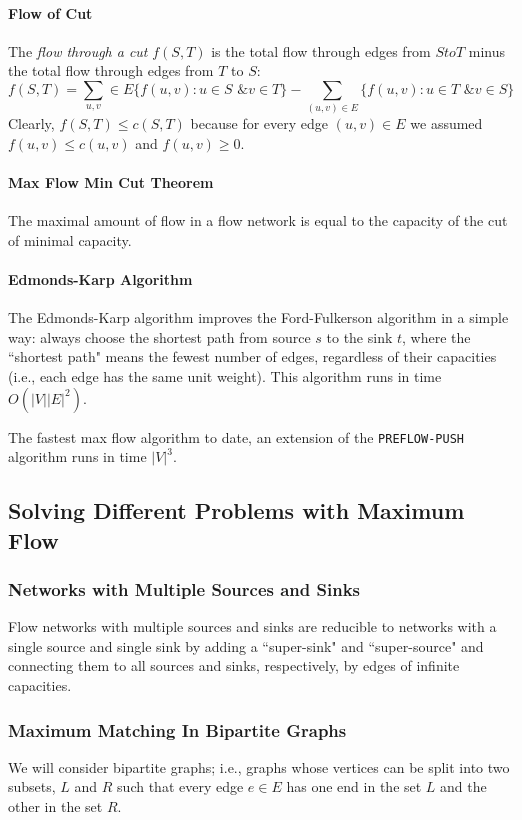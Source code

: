 \paragraph{Flow of Cut}
The \textit{flow through a cut} \(f(S,T)\) is the total flow through edges from
\(S to T\) minus the total flow through edges from \(T\) to \(S\):
\[
    f(S,T) = \sum_{u,v} \in E \{f(u,v): u \in S \text{ \& } v \in T\}
    - \sum_{(u,v) \in E} \{f(u,v): u \in T \text{ \& } v \in S\}
\]
Clearly, \(f(S,T) \leq c(S,T)\) because for every edge \((u, v) \in E\) we assumed
\(f(u,v) \leq c(u,v)\) and \(f(u,v) \geq 0\).

\paragraph{Max Flow Min Cut Theorem}
The maximal amount of flow in a flow network is equal to the capacity of the
cut of minimal capacity.

\paragraph{Edmonds-Karp Algorithm}
The Edmonds-Karp algorithm improves the Ford-Fulkerson algorithm in a simple way:
always choose the shortest path from source \(s\) to the sink \(t\), where
the ``shortest path" means the fewest number of edges, regardless of their capacities
(i.e., each edge has the same unit weight). This algorithm runs in time \(O(|V||E|^2)\).

The fastest max flow algorithm to date, an extension of the \texttt{PREFLOW-PUSH}
algorithm runs in time \(|V|^3\).

\subsection{Solving Different Problems with Maximum Flow}
\subsubsection{Networks with Multiple Sources and Sinks}
Flow networks with multiple sources and sinks are reducible to networks with
a single source and single sink by adding a ``super-sink" and ``super-source" and
connecting them to all sources and sinks, respectively, by edges of infinite capacities.

\subsubsection{Maximum Matching In Bipartite Graphs}
We will consider bipartite graphs; i.e., graphs whose vertices can be split into two
subsets, \(L\) and \(R\) such that every edge \(e \in E\) has one end in the set \(L\)
and the other in the set \(R\).

